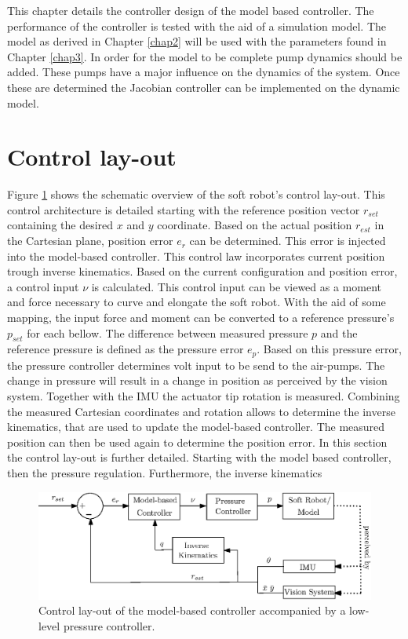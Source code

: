 \label{chap4}

This chapter details the controller design of the model based controller. The performance of the controller is tested with the aid of a simulation model. The model as derived in Chapter \ref{chap2} will be used with the parameters found in Chapter \ref{chap3}. In order for the model to be complete pump dynamics should be added. These pumps have a major influence on the dynamics of the system. Once these are determined the Jacobian controller can be implemented on the dynamic model. 



\section{Control lay-out}

Figure \ref{fig4:controllayout} shows the schematic overview of the soft robot's control lay-out. This control architecture is detailed starting with the reference position vector $r_{set}$ containing the desired $x$ and $y$ coordinate. Based on the actual position $r_{est}$ in the Cartesian plane, position error $e_r$ can be determined. This error is injected into the model-based controller. This control law incorporates current position trough inverse kinematics. Based on the current configuration and position error, a control input $\nu$ is calculated. This control input can be viewed as a moment and force necessary to curve and elongate the soft robot. With the aid of some mapping, the input force and moment can be converted to a reference pressure's $p_{set}$ for each bellow. The difference between measured pressure $p$ and the reference pressure is defined as the pressure error $e_p$. Based on this pressure error, the pressure controller determines volt input to be send to the air-pumps. The change in pressure will result in a change in position as perceived by the vision system. Together with the IMU the actuator tip rotation is measured. Combining the measured Cartesian coordinates and rotation allows to determine the inverse kinematics, that are used to update the model-based controller. The measured position can then be used again to determine the position error. In this section the control lay-out is further detailed. Starting with the model based controller, then the pressure regulation. Furthermore, the inverse kinematics 


\begin{figure}[H]
    \centering
    \includegraphics[width = \textwidth]{Figures/Chapter4/controlschemeActual.eps}
    \caption{Control lay-out of the model-based controller accompanied by a low-level pressure controller.}
    \label{fig4:controllayout}
\end{figure}




